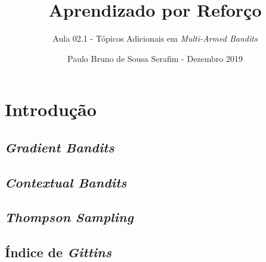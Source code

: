 \documentclass{article}
\title{Aprendizado por Reforço}
\author{Aula 02.1 - Tópicos Adicionais em \textit{Multi-Armed Bandits}}
\date{Paulo Bruno de Sousa Serafim - Dezembro 2019}
\begin{document}
\maketitle

\section{Introdução}

    \subsection{\textit{Gradient Bandits}}
        
    \subsection{\textit{Contextual Bandits}}
    
    \subsection{\textit{Thompson Sampling}}
    
    \subsection{Índice de \textit{Gittins}}
    
\end{document}
